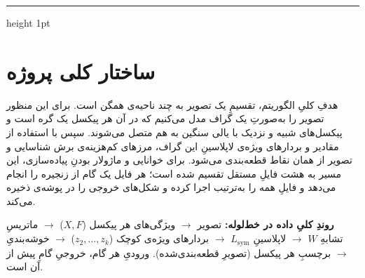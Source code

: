 \documentclass[13pt]{extarticle}
\newcommand{\file}[1]{\lr{\texttt{#1}}}
\begin{document}
\vspace{4pt}
{\color{headblue!40}\hrule height 1pt}
\vspace{10pt}

\section{ساختار کلی پروژه}

هدفِ کلیِ الگوریتم، تقسیمِ یک تصویر به چند ناحیه‌ی همگن است. برای این منظور تصویر را به‌صورتِ یک گراف مدل می‌کنیم که در آن هر پیکسل یک گره است و پیکسل‌های شبیه و نزدیک با یالی سنگین به هم متصل می‌شوند. سپس با استفاده از مقادیر و بردارهای ویژه‌ی لاپلاسینِ این گراف، مرزهای کم‌هزینه‌ی برش شناسایی و تصویر از همان نقاط قطعه‌بندی می‌شود. برای خوانایی و ماژولار بودنِ پیاده‌سازی، این مسیر به هشت فایلِ مستقل تقسیم شده است؛ هر فایل یک گام از زنجیره را انجام می‌دهد و فایلِ \file{run\_all.py} همه را به‌ترتیب اجرا کرده و شکل‌های خروجی را در پوشه‌ی \file{outputs/} ذخیره می‌کند.

\smallskip
\noindent\textbf{روندِ کلیِ داده در خط‌لوله:} تصویر $\rightarrow$ ویژگی‌های هر پیکسل ($X,F$) $\rightarrow$ ماتریسِ تشابهِ $W$ $\rightarrow$ لاپلاسینِ $L_{\mathrm{sym}}$ $\rightarrow$ بردارهای ویژه‌ی کوچک ($z_2,\dots,z_k$) $\rightarrow$ خوشه‌بندیِ  $\rightarrow$ برچسبِ هر پیکسل (تصویرِ قطعه‌بندی‌شده). ورودیِ هر گام، خروجیِ گامِ پیش از آن است.
\end{document}
